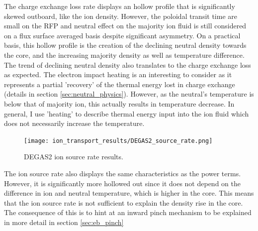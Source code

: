 The charge exchange loss rate displays an hollow profile that is significantly skewed outboard, like the ion density. However, the poloidal transit time are small on the RFP and neutral effect on the majority ion fluid is still considered on a flux surface averaged basis despite significant asymmetry. On a practical basis, this hollow profile is the creation of the declining neutral density towards the core, and the increasing majority density as well as temperature difference. The trend of declining neutral density also translates to the charge exchange loss as expected. The electron impact heating is an interesting to consider as it represents a partial 'recovery' of the thermal energy lost in charge exchange (details in section \ref{sec:neutral_physics}). However, as the neutral's temperature is below that of majority ion, this actually results in temperature decrease. In general, I use 'heating' to describe thermal energy input into the ion fluid which does not necessarily increase the temperature. 

\begin{figure}
    \centering
    \texttt{[image: ion\_transport\_results/DEGAS2\_source\_rate.png]}
    \caption{DEGAS2 ion source rate results.}
    \label{fig:DEGAS2_power_1d}
\end{figure}

The ion source rate also displays the same characteristics as the power terms. However, it is significantly more hollowed out since it does not depend on the difference in ion and neutral temperature, which is higher in the core. This means that the ion source rate is not sufficient to explain the density rise in the core. The consequence of this is to hint at an inward pinch mechanism to be explained in more detail in section \ref{sec:eb_pinch}

